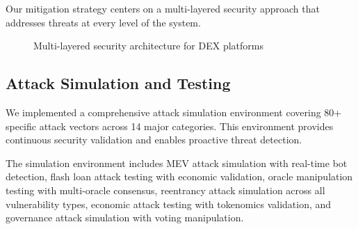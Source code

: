 \documentclass[11pt,a4paper]{article}
\begin{document}
Our mitigation strategy centers on a multi-layered security approach that addresses threats at every level of the system.

\begin{figure}[h]
\centering
{}
\caption{Multi-layered security architecture for DEX platforms}
\end{figure}

\subsection{Attack Simulation and Testing}

We implemented a comprehensive attack simulation environment covering 80+ specific attack vectors across 14 major categories. This environment provides continuous security validation and enables proactive threat detection.

The simulation environment includes MEV attack simulation with real-time bot detection, flash loan attack testing with economic validation, oracle manipulation testing with multi-oracle consensus, reentrancy attack simulation across all vulnerability types, economic attack testing with tokenomics validation, and governance attack simulation with voting manipulation.
\end{document}
